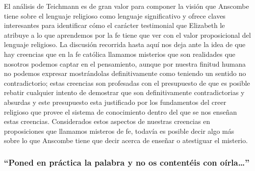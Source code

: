 El análisis de Teichmann es de gran valor para componer la visión que Anscombe tiene sobre el lenguaje religioso como lenguaje significativo y ofrece claves interesantes para identificar cómo el carácter testimonial que Elizabeth le atribuye a lo que aprendemos por la fe tiene que ver con el valor proposicional del lenguaje religioso. La discusión recorrida hasta aquí nos deja ante la idea de que hay creencias que en la fe católica llamamos misterios que son realidades que nosotros podemos captar en el pensamiento, aunque por nuestra finitud humana no podemos expresar mostrándolas definitivamente como teniendo un sentido no contradictorio; estas creencias son profesadas con el presupuesto de que es posible rebatir cualquier intento de demostrar que son definitivamente contradictorias y absurdas y este presupuesto esta justificado por los fundamentos del creer religioso que provee el sistema de conocimiento dentro del que se nos enseñan estas creencias. Considerados estos aspectos de nuestras creencias en proposiciones que llamamos misteros de fe, todavía es posible decir algo más sobre lo que Anscombe tiene que decir acerca de enseñar o atestiguar el misterio.

\subsubsection{\enquote{Poned en práctica la palabra y no os contentéis con oírla\ldots}}

